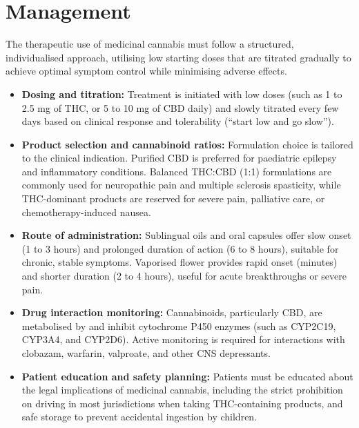 \section*{Management}
The therapeutic use of medicinal cannabis must follow a structured, individualised approach, utilising low starting doses that are titrated gradually to achieve optimal symptom control while minimising adverse effects.
\begin{itemize}
    \item \textbf{Dosing and titration:} Treatment is initiated with low doses (such as 1 to 2.5 mg of THC, or 5 to 10 mg of CBD daily) and slowly titrated every few days based on clinical response and tolerability (``start low and go slow'').
    \item \textbf{Product selection and cannabinoid ratios:} Formulation choice is tailored to the clinical indication. Purified CBD is preferred for paediatric epilepsy and inflammatory conditions. Balanced THC:CBD (1:1) formulations are commonly used for neuropathic pain and multiple sclerosis spasticity, while THC-dominant products are reserved for severe pain, palliative care, or chemotherapy-induced nausea.
    \item \textbf{Route of administration:} Sublingual oils and oral capsules offer slow onset (1 to 3 hours) and prolonged duration of action (6 to 8 hours), suitable for chronic, stable symptoms. Vaporised flower provides rapid onset (minutes) and shorter duration (2 to 4 hours), useful for acute breakthroughs or severe pain.
    \item \textbf{Drug interaction monitoring:} Cannabinoids, particularly CBD, are metabolised by and inhibit cytochrome P450 enzymes (such as CYP2C19, CYP3A4, and CYP2D6). Active monitoring is required for interactions with clobazam, warfarin, valproate, and other CNS depressants.
    \item \textbf{Patient education and safety planning:} Patients must be educated about the legal implications of medicinal cannabis, including the strict prohibition on driving in most jurisdictions when taking THC-containing products, and safe storage to prevent accidental ingestion by children.
\end{itemize}

